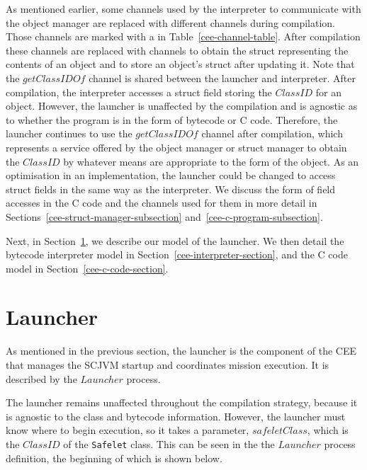 As mentioned earlier, some channels used by the interpreter to
communicate with the object manager are replaced with different
channels during compilation.
Those channels are marked with a \ddag{} in
Table~\ref{cee-channel-table}.
After compilation these channels are replaced with channels to obtain
the struct representing the contents of an object and to store an
object’s struct after updating it.
Note that the $getClassIDOf$ channel is shared between the launcher
and interpreter.
After compilation, the interpreter accesses a struct field storing the
$ClassID$ for an object.
However, the launcher is unaffected by the compilation and is agnostic
as to whether the program is in the form of bytecode or C code.
Therefore, the launcher continues to use the $getClassIDOf$ channel
after compilation, which represents a service offered by the object
manager or struct manager to obtain the $ClassID$ by whatever means
are appropriate to the form of the object.
As an optimisation in an implementation, the launcher could be changed
to access struct fields in the same way as the interpreter.
We discuss the form of field accesses in the C code and the channels
used for them in more detail in
Sections~\ref{cee-struct-manager-subsection}
and~\ref{cee-c-program-subsection}.

%

%


Next, in Section~\ref{cee-launcher-section}, we describe our model of
the launcher.
We then detail the bytecode interpreter model in
Section~\ref{cee-interpreter-section}, and the C code model in
Section~\ref{cee-c-code-section}.

\section{Launcher}
\label{cee-launcher-section}

As mentioned in the previous section, the launcher is the component of
the CEE that manages the SCJVM startup and coordinates mission
execution.
It is described by the $Launcher$ process.

The launcher remains unaffected throughout the compilation strategy,
because it is agnostic to the class and bytecode information.
However, the launcher must know where to begin execution, so it takes
a parameter, $safeletClass$, which is the $ClassID$ of the
\texttt{Safelet} class.
This can be seen in the the $Launcher$ process definition, the
beginning of which is shown below.

